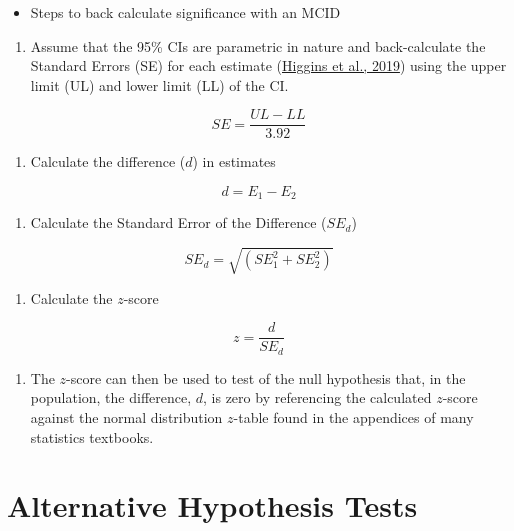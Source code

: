 \documentclass[]{cik}%
\begin{document}
\begin{itemize}
\tightlist
\item
  Steps to back calculate significance with an MCID
\end{itemize}

\begin{enumerate}
\def\labelenumi{\arabic{enumi}.}
\tightlist
\item
  Assume that the 95\% CIs are parametric in nature and back-calculate
  the Standard Errors (SE) for each estimate
  (\protect\hyperlink{ref-cochrane6}{Higgins et al., 2019}) using the
  upper limit (UL) and lower limit (LL) of the CI.
\end{enumerate}

\[
SE = \frac{UL-LL}{3.92}
\]

\begin{enumerate}
\def\labelenumi{\arabic{enumi}.}
\setcounter{enumi}{1}
\tightlist
\item
  Calculate the difference (\(d\)) in estimates
\end{enumerate}

\[
d = E_1 - E_2
\]

\begin{enumerate}
\def\labelenumi{\arabic{enumi}.}
\setcounter{enumi}{2}
\tightlist
\item
  Calculate the Standard Error of the Difference (\(SE_d\))
\end{enumerate}

\[
SE_d = \sqrt{(SE_1^2 + SE_2^2)}
\]

\begin{enumerate}
\def\labelenumi{\arabic{enumi}.}
\setcounter{enumi}{3}
\tightlist
\item
  Calculate the \(z\)-score
\end{enumerate}

\[
z = \frac{d }{ SE_d}
\]

\begin{enumerate}
\def\labelenumi{\arabic{enumi}.}
\setcounter{enumi}{4}
\tightlist
\item
  The \(z\)-score can then be used to test of the null hypothesis that,
  in the population, the difference, \(d\), is zero by referencing the
  calculated \(z\)-score against the normal distribution \(z\)-table
  found in the appendices of many statistics textbooks.
\end{enumerate}

\hypertarget{alternative-hypothesis-tests}{%
\section{Alternative Hypothesis
Tests}\label{alternative-hypothesis-tests}}
\end{document}
